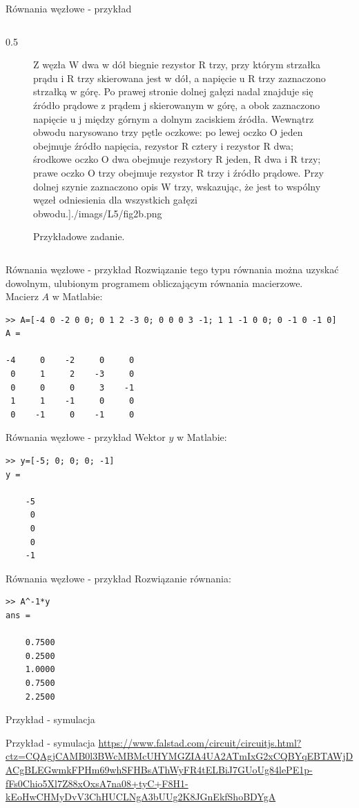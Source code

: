 \begin{frame}{Równania węzłowe - przykład}
\begin{columns}
\begin{column}{0.5\textwidth}
\begin{figure}
{							Z węzła W dwa w dół biegnie rezystor R trzy, przy którym strzałka prądu i R trzy skierowana jest w dół, a napięcie u R trzy zaznaczono strzałką w górę.
							Po prawej stronie dolnej gałęzi nadal znajduje się źródło prądowe z prądem j skierowanym w górę, a obok zaznaczono napięcie u j między górnym a dolnym zaciskiem źródła.
							Wewnątrz obwodu narysowano trzy pętle oczkowe: po lewej oczko O jeden obejmuje źródło napięcia, rezystor R cztery i rezystor R dwa; środkowe oczko O dwa obejmuje rezystory R jeden, R dwa i R trzy; prawe oczko O trzy obejmuje rezystor R trzy i źródło prądowe.
							Przy dolnej szynie zaznaczono opis W trzy, wskazując, że jest to wspólny węzeł odniesienia dla wszystkich gałęzi obwodu.}]{./imags/L5/fig2b.png}
				\caption{Przykładowe zadanie.}
			\end{figure}
		\end{column}
	\end{columns}
\end{frame}

\begin{frame}[fragile]{Równania węzłowe - przykład}
	Rozwiązanie tego typu równania można uzyskać dowolnym, ulubionym programem
	obliczającym równania macierzowe.\\
	Macierz \(A\) w Matlabie:
	\begin{lstlisting}[style=python-wcag]
>> A=[-4 0 -2 0 0; 0 1 2 -3 0; 0 0 0 3 -1; 1 1 -1 0 0; 0 -1 0 -1 0]
A =

-4     0    -2     0     0
 0     1     2    -3     0
 0     0     0     3    -1
 1     1    -1     0     0
 0    -1     0    -1     0
\end{lstlisting}
\end{frame}

\begin{frame}[fragile]{Równania węzłowe - przykład}
	Wektor \(y\) w Matlabie:
	\begin{lstlisting}[style=python-wcag]
>> y=[-5; 0; 0; 0; -1]
y =

    -5
     0
     0
     0
    -1
\end{lstlisting}
\end{frame}

\begin{frame}[fragile]{Równania węzłowe - przykład}
	Rozwiązanie równania:
	\begin{lstlisting}[style=python-wcag]
>> A^-1*y
ans =

    0.7500
    0.2500
    1.0000
    0.7500
    2.2500
\end{lstlisting}
\end{frame}

\begin{frame}{Przykład - symulacja}
	\begin{block}{Przykład - symulacja}
		\url{https://www.falstad.com/circuit/circuitjs.html?ctz=CQAgjCAMB0l3BWcMBMcUHYMGZIA4UA2ATmIxG2xCQBYqEBTAWjDACgBLEGwmkFPHm69whSFHBsAThWyFR4tELBiJ7GUoUg84lePE1p-fFs0Chio5Xl7Z88xOxsA7na08+tyC+F8H1-kEoHwCHMyDvV3ChHUCLNgA3bUUg2K8JGnEkfShoBDYgA}
	\end{block}
\end{frame}